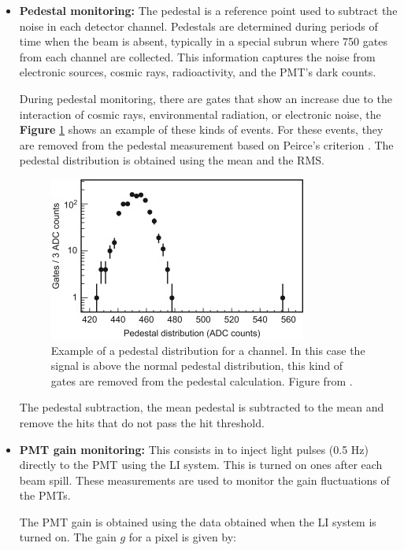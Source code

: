 \begin{itemize}
    \item \textbf{Pedestal monitoring:} The pedestal is a reference point used to subtract the noise in each detector channel. Pedestals are determined during periods of time when the beam is absent, typically in a special subrun where 750 gates from each channel are collected. This information captures the noise from electronic sources, cosmic rays, radioactivity, and the PMT's dark counts.

    During pedestal monitoring, there are gates that show an increase due to the interaction of cosmic rays, environmental radiation, or electronic noise, the \textbf{Figure} \ref{fig:MnvExp:MnvDetector:Calibration:InSitu:Pedestal} shows an example of these kinds of events. For these events, they are removed from the pedestal measurement based on Peirce's criterion \cite{PeirceCriterion}. The pedestal distribution is obtained using the mean and the RMS.

    \begin{figure}[!htb]
        \centering
        \includegraphics{Figures/Chapter2/Pedestal.jpg}
        \caption{Example of a pedestal distribution for a channel. In this case the signal is above the normal pedestal distribution, this kind of gates are removed from the pedestal calculation. Figure from \cite{MINERvA}.}
        \label{fig:MnvExp:MnvDetector:Calibration:InSitu:Pedestal}
    \end{figure}
    The pedestal subtraction, the mean pedestal is subtracted to the mean and remove the hits that do not pass the hit threshold.

    
    \item \textbf{PMT gain monitoring:} This consists in to inject light pulses (0.5 Hz) directly to the PMT using the LI system. This is turned on ones after each beam spill. These measurements are used to monitor the gain fluctuations of the PMTs. 
    
    The PMT gain is obtained using the data obtained when the LI system is turned on. The gain $g$ for a pixel is given by:


\end{itemize}
